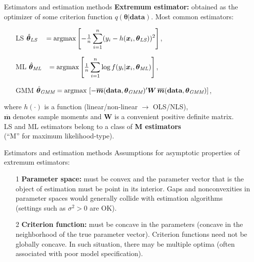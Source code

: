 \documentclass{beamer}
\begin{document}
\begin{frame}{Estimators and estimation methods}
\textbf{Extremum estimator:} obtained as the optimizer of some criterion function $q(\bm{\theta}|\textbf{data})$. Most common estimators:
\medskip
\begin{itemize}
    \item[LS] $\hat{\bm{\theta}}_{\textit{LS}}~~~=\textnormal{argmax}\left[ -\frac{1}{n} \displaystyle\sum_{i=1}^n (y_i - h(\bm{x}_i,\bm{\theta}_{\textit{LS}}))^2\right]$,
    \item[ML] $\hat{\bm{\theta}}_{\textit{ML}}~~\,=\textnormal{argmax}\left[ \frac{1}{n} \displaystyle\sum_{i=1}^n \log f(y_i|\bm{x}_i,\bm{\theta}_{\textit{ML}})\right]$,
    \item[GMM] $\hat{\bm{\theta}}_{\textit{GMM}}=\textnormal{argmax}\,\left[ -\overline{\bm{m}}(\textbf{data},\bm{\theta}_{\textit{GMM}})^{\prime}\bm{W} \, \overline{\bm{m}} (\textbf{data},\bm{\theta}_{\textit{GMM}})\right]$,
\end{itemize}
\medskip
where $h(\cdot)$ is a function (linear/non-linear $\rightarrow$ OLS/NLS), \\$\overline{\bm{m}}$ denotes sample moments and $\bm{W}$ is a convenient positive definite matrix.\\
\medskip
LS and ML estimators belong to a class of \textbf{M estimators} \\(``M'' for maximum likelihood-type).
\end{frame}
\begin{frame}{Estimators and estimation methods}
Assumptions for asymptotic properties of extremum estimators:
\medskip
\begin{itemize}
    \item[1] \textbf{Parameter space:} must be convex and the parameter vector that is the object of estimation must be point in its interior. Gaps and nonconvexities in parameter spaces would generally collide with estimation algorithms \\(settings such as $\sigma^2 > 0$ are OK).
    \medskip
    \item[2] \textbf{Criterion function:} must be concave in the parameters (concave in the neighborhood of the true parameter vector). Criterion functions need not be globally concave. In such situation, there may be multiple optima (often associated with poor model specification).
\end{itemize}
\end{frame}
\end{document}
